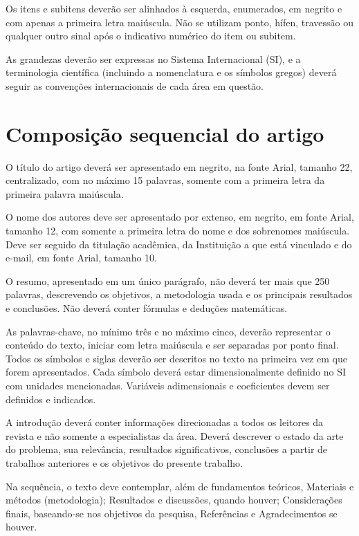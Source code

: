 \documentclass[12pt]{article}
\begin{document}
Os itens e subitens deverão ser alinhados à esquerda, enumerados, em negrito e com apenas a primeira letra maiúscula. Não se utilizam ponto, hífen, travessão ou qualquer outro sinal após o indicativo numérico do item ou subitem.  

As grandezas deverão ser expressas no Sistema Internacional (SI), e a terminologia científica (incluindo a nomenclatura e os símbolos gregos) deverá seguir as convenções internacionais de cada área em questão.  

\section{Composição sequencial do artigo}

O título do artigo deverá ser apresentado em negrito, na fonte Arial, tamanho 22, centralizado, com no máximo 15 palavras, somente com a primeira letra da primeira palavra maiúscula. 

O nome dos autores deve ser apresentado por extenso, em negrito, em fonte Arial, tamanho 12, com somente a primeira letra do nome e dos sobrenomes maiúscula. Deve ser seguido da titulação acadêmica, da Instituição a que está vinculado e do e-mail, em fonte Arial, tamanho 10. 

O resumo, apresentado em um único parágrafo, não deverá ter mais que 250 palavras, descrevendo os objetivos, a metodologia usada e os principais resultados e conclusões. Não deverá conter fórmulas e deduções matemáticas.  

As palavras-chave, no mínimo três e no máximo cinco, deverão representar o conteúdo do texto, iniciar com letra maiúscula e ser separadas por ponto final.
Todos os símbolos e siglas deverão ser descritos no texto na primeira vez em que forem apresentados. Cada símbolo deverá estar dimensionalmente definido no SI com unidades mencionadas. Variáveis adimensionais e coeficientes devem ser definidos e indicados. 

A introdução deverá conter informações direcionadas a todos os leitores da revista e não somente a especialistas da área. Deverá descrever o estado da arte do problema, sua relevância, resultados significativos, conclusões a partir de trabalhos anteriores e os objetivos do presente trabalho. 

Na sequência, o texto deve contemplar, além de fundamentos teóricos, Materiais e métodos (metodologia); Resultados e discussões, quando houver; Considerações finais, baseando-se nos objetivos da pesquisa, Referências e Agradecimentos se houver. 
\end{document}
